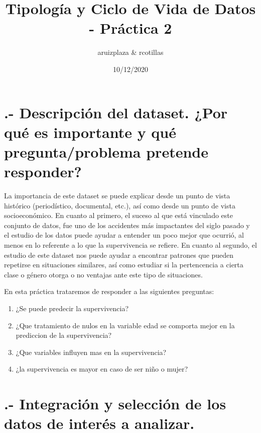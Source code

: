 \documentclass[
]{article}
\title{Tipología y Ciclo de Vida de Datos - Práctica 2}
\author{aruizplaza \& rcotillas}
\date{10/12/2020}
\begin{document}
\maketitle

{
\setcounter{tocdepth}{2}
\tableofcontents
}
\hypertarget{descripciuxf3n-del-dataset.-por-quuxe9-es-importante-y-quuxe9-preguntaproblema-pretende-responder}{%
\section{.- Descripción del dataset. ¿Por qué es importante y qué
pregunta/problema pretende
responder?}\label{descripciuxf3n-del-dataset.-por-quuxe9-es-importante-y-quuxe9-preguntaproblema-pretende-responder}}

La importancia de este dataset se puede explicar desde un punto de vista
histórico (periodístico, documental, etc.), así como desde un punto de
vista socioeconómico. En cuanto al primero, el suceso al que está
vinculado este conjunto de datos, fue uno de los accidentes más
impactantes del siglo pasado y el estudio de los datos puede ayudar a
entender un poco mejor que ocurrió, al menos en lo referente a lo que la
supervivencia se refiere. En cuanto al segundo, el estudio de este
dataset nos puede ayudar a encontrar patrones que pueden repetirse en
situaciones similares, así como estudiar si la pertencencia a cierta
clase o género otorga o no ventajas ante este tipo de situaciones.

En esta práctica trataremos de responder a las siguientes preguntas:

\begin{enumerate}
\def\labelenumi{(\arabic{enumi})}
\item
  ¿Se puede predecir la supervivencia?
\item
  ¿Que tratamiento de nulos en la variable edad se comporta mejor en la
  prediccion de la supervivencia?
\item
  ¿Que variables influyen mas en la supervivencia?
\item
  ¿la supervivencia es mayor en caso de ser niño o mujer?
\end{enumerate}

\hypertarget{integraciuxf3n-y-selecciuxf3n-de-los-datos-de-interuxe9s-a-analizar.}{%
\section{.- Integración y selección de los datos de interés a
analizar.}\label{integraciuxf3n-y-selecciuxf3n-de-los-datos-de-interuxe9s-a-analizar.}}
\end{document}
